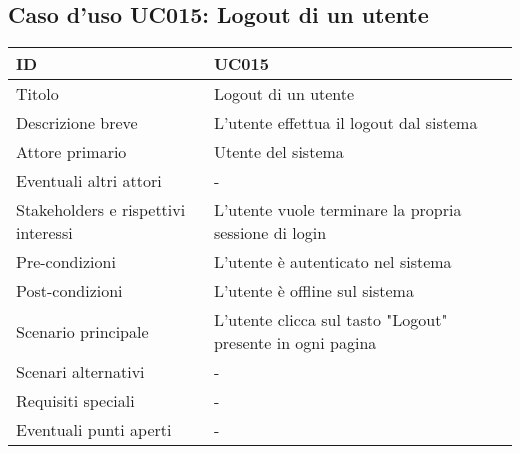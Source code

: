 \documentclass[../../main.tex]{subfiles}
\begin{document}
\subsection{Caso d’uso UC015: Logout di un utente }
\begin{tabularx}{150mm}{|l|X|}
    \hline
    ID                                  & \textbf{UC015}\\
    \hline
    Titolo                              & Logout di un utente \\
    \hline
    Descrizione breve                   & L'utente effettua il logout dal sistema   \\
    \hline
    Attore primario                     & Utente del sistema   \\
    \hline
    Eventuali altri attori              & -   \\
    \hline
    Stakeholders e rispettivi interessi & L'utente vuole terminare la propria sessione di login   \\
    \hline
    Pre-condizioni                      & L'utente è autenticato nel sistema   \\
    \hline
    Post-condizioni                     & L'utente è offline sul sistema    \\
    \hline
    Scenario principale                 & L'utente clicca sul tasto "Logout" presente in ogni pagina   \\
    \hline
    Scenari alternativi                 & -   \\
    \hline
    Requisiti speciali                  & -   \\
    \hline
    Eventuali punti aperti              & -   \\
    \hline
\end{tabularx}
\end{document}
